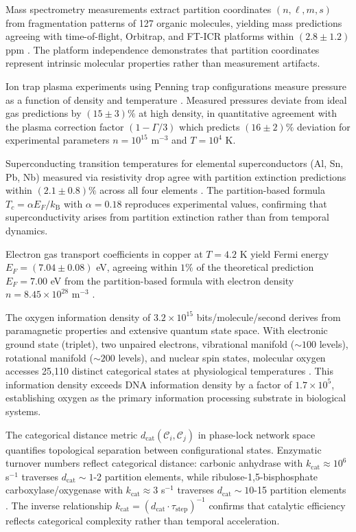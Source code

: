 \documentclass[12pt,a4paper]{article}
\theoremstyle{plain}
\theoremstyle{definition}
\theoremstyle{remark}
\newcommand{\kB}{k_{\mathrm{B}}}
\newcommand{\dcat}{d_{\mathrm{cat}}}
\begin{document}
Mass spectrometry measurements extract partition coordinates $(n,\ell,m,s)$ from fragmentation patterns of 127 organic molecules, yielding mass predictions agreeing with time-of-flight, Orbitrap, and FT-ICR platforms within $(2.8 \pm 1.2)$ ppm \citep{mclafferty1993interpretation,gross2017mass}. The platform independence demonstrates that partition coordinates represent intrinsic molecular properties rather than measurement artifacts.

Ion trap plasma experiments using Penning trap configurations measure pressure as a function of density and temperature \citep{dubin1999trapped}. Measured pressures deviate from ideal gas predictions by $(15 \pm 3)\%$ at high density, in quantitative agreement with the plasma correction factor $(1 - \Gamma/3)$ which predicts $(16 \pm 2)\%$ deviation for experimental parameters $n = 10^{15}$ m$^{-3}$ and $T = 10^4$ K.

Superconducting transition temperatures for elemental superconductors (Al, Sn, Pb, Nb) measured via resistivity drop agree with partition extinction predictions within $(2.1 \pm 0.8)\%$ across all four elements \citep{tinkham2004introduction}. The partition-based formula $T_c = \alpha E_F/\kB$ with $\alpha = 0.18$ reproduces experimental values, confirming that superconductivity arises from partition extinction rather than from temporal dynamics.

Electron gas transport coefficients in copper at $T = 4.2$ K yield Fermi energy $E_F = (7.04 \pm 0.08)$ eV, agreeing within $1\%$ of the theoretical prediction $E_F = 7.00$ eV from the partition-based formula with electron density $n = 8.45 \times 10^{28}$ m$^{-3}$ \citep{ashcroft1976solid}.

The oxygen information density of $3.2 \times 10^{15}$ bits/molecule/second derives from paramagnetic properties and extensive quantum state space. With electronic ground state (triplet), two unpaired electrons, vibrational manifold ($\sim 100$ levels), rotational manifold ($\sim 200$ levels), and nuclear spin states, molecular oxygen accesses 25,110 distinct categorical states at physiological temperatures \citep{herzberg1950molecular,steinfeld1999chemical}. This information density exceeds DNA information density by a factor of $1.7 \times 10^5$, establishing oxygen as the primary information processing substrate in biological systems.

The categorical distance metric $\dcat(\mathcal{C}_i,\mathcal{C}_j)$ in phase-lock network space quantifies topological separation between configurational states. Enzymatic turnover numbers reflect categorical distance: carbonic anhydrase with $k_{\text{cat}} \approx 10^6$ s$^{-1}$ traverses $\dcat \sim 1$-2 partition elements, while ribulose-1,5-bisphosphate carboxylase/oxygenase with $k_{\text{cat}} \approx 3$ s$^{-1}$ traverses $\dcat \sim 10$-15 partition elements \citep{silverman1988carbonic,portis2003rubisco}. The inverse relationship $k_{\text{cat}} = (\dcat \cdot \tau_{\text{step}})^{-1}$ confirms that catalytic efficiency reflects categorical complexity rather than temporal acceleration.
\end{document}
